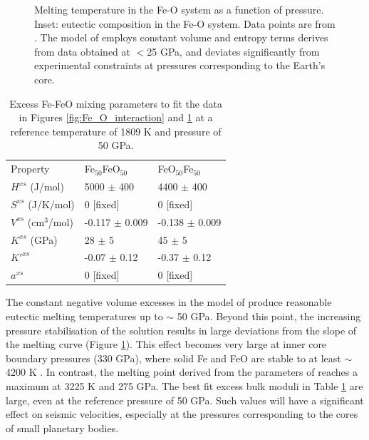 \begin{figure}[ht!]
  \centering
  \caption{Melting temperature in the Fe-O system as a function of pressure. Inset: eutectic composition in the Fe-O system. Data points are from \cite{SHCPW2008}. The model of \cite{Frostetal2010} employs constant volume and entropy terms derives from data obtained at $<$25 GPa, and deviates significantly from experimental constraints at pressures corresponding to the Earth's core.}
  \label{fig:Fe_O_melting}
\end{figure}

\begin{table}[ht!]
\centering
\caption{Excess Fe-FeO mixing parameters to fit the data in Figures \ref{fig:Fe_O_interaction} and \ref{fig:Fe_O_melting} at a reference temperature of 1809 K and pressure of 50 GPa.}
\label{tab:Fe_FeO}
\begin{tabular}{lll}
  Property        & Fe$_{50}$FeO$_{50}$  & FeO$_{50}$Fe$_{50}$ \\
  $H^{xs}$ (J/mol) &  5000 $\pm$ 400 & 4400 $\pm$ 400  \\
  $S^{xs}$ (J/K/mol)  & 0 [fixed] & 0 [fixed] \\
  $V^{xs}$ (cm$^3$/mol)   & -0.117 $\pm$ 0.009 &  -0.138 $\pm$ 0.009 \\
  $K^{xs}$  (GPa)  & 28 $\pm$ 5 & 45 $\pm$ 5  \\
  $K'^{xs}$   & -0.07 $\pm$ 0.12 & -0.37 $\pm$ 0.12  \\
  $a^{xs}$   & 0 [fixed] & 0 [fixed]  
\end{tabular}
\end{table}


The constant negative volume excesses in the model of \cite{Frostetal2010} produce reasonable eutectic melting temperatures up to $\sim$ 50 GPa. Beyond this point, the increasing pressure stabilisation of the solution results in large deviations from the slope of the melting curve (Figure \ref{fig:Fe_O_melting}). This effect becomes very large at inner core boundary pressures (330 GPa), where solid Fe and FeO are stable to at least $\sim$4200 K \citep{OTHOH2011}. In contrast, the melting point derived from the parameters of \cite{Frostetal2010} reaches a maximum at 3225 K and 275 GPa. The best fit excess bulk moduli in Table \ref{tab:Fe_FeO} are large, even at the reference pressure of 50 GPa. Such values will have a significant effect on seismic velocities, especially at the pressures corresponding to the cores of small planetary bodies.


